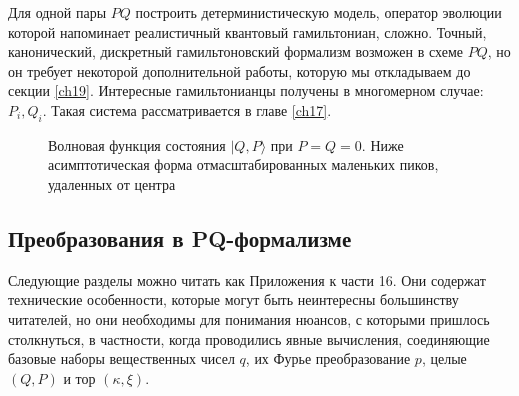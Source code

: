 \documentclass[main.tex]{subfiles}
\begin{document}
Для одной пары $P Q$ построить детерминистическую модель, оператор эволюции которой напоминает реалистичный квантовый гамильтониан, сложно. Точный, канонический, дискретный гамильтоновский формализм возможен в схеме $P Q$, но он требует некоторой дополнительной работы, которую мы откладываем до секции \ref{ch19}. Интересные гамильтонианцы получены в многомерном случае: $P_{i}, Q_{i} .$ Такая система рассматривается в главе \ref{ch17}.
 
\begin{figure}[ht]
	\begin{center}
		\caption{
		\label{i16.1} Волновая функция состояния $|Q, P\rangle$ при $P =Q= 0$. Ниже асимптотическая форма отмасштабированных маленьких пиков, удаленных от центра}
	\end {center}
\end {figure}



\subsection{Преобразования в PQ-формализме}\label{ch16.2}

Следующие разделы можно читать как Приложения к части 16. Они содержат технические особенности, которые могут быть неинтересны большинству читателей, но они необходимы для понимания нюансов, с которыми пришлось столкнуться, в частности, когда проводились явные вычисления, соединяющие базовые наборы вещественных чисел $q$, их Фурье преобразование $p$, целые $(Q, P)$ и тор $(\kappa, \xi)$.
\end{document}
